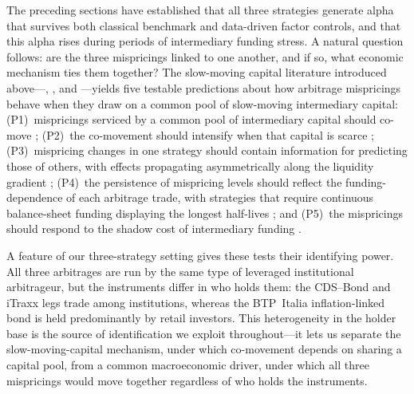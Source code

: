 


The preceding sections have established that all three strategies
generate alpha that survives both classical benchmark and data-driven
factor controls, and that this alpha rises during periods of
intermediary funding stress. A natural question follows: are the
three mispricings linked to one another, and if so, what economic
mechanism ties them together? The slow-moving capital literature
introduced above---\citet{duffie2010presidential},
\citet{brunnermeier2009market}, and \citet{mitchell2012arbitrage}---yields
five testable predictions about how arbitrage mispricings behave when they
draw on a common pool of slow-moving intermediary capital:
(P1)~mispricings serviced by a common pool of intermediary capital
should co-move \citep{duffie2010presidential}; (P2)~the co-movement
should intensify when that capital is scarce
\citep{duffie2010presidential, brunnermeier2009market};
(P3)~mispricing changes in one strategy should contain information for
predicting those of others, with effects propagating asymmetrically
along the liquidity gradient \citep{mitchell2012arbitrage, fleckenstein2014tips};
(P4)~the persistence of mispricing levels should reflect the
funding-dependence of each arbitrage trade, with strategies that
require continuous balance-sheet funding displaying the longest
half-lives \citep{boyarchenko2016trends}; and (P5)~the mispricings
should respond to the shadow cost of intermediary funding
\citep{duffie2010presidential, brunnermeier2009market}.

A feature of our three-strategy setting gives these tests their
identifying power. All three arbitrages are run by the same type of
leveraged institutional arbitrageur, but the instruments differ in who
holds them: the CDS--Bond and iTraxx legs trade among institutions,
whereas the BTP~Italia inflation-linked bond is held predominantly by
retail investors. This heterogeneity in the holder base is the source
of identification we exploit throughout---it lets us separate the
slow-moving-capital mechanism, under which co-movement depends on
sharing a capital pool, from a common macroeconomic driver, under which
all three mispricings would move together regardless of who holds the
instruments.

